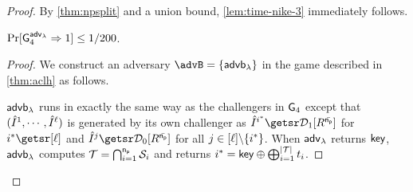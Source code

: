 \begin{proof}
By \cref{thm:npsplit} and a union bound, \cref{lem:time-nike-3} immediately follows. 
%
%
\begin{lemma}
$\Pr[\mathsf{G}_4^{{\mathsf{adv}}_\lambda}\Rightarrow 1]\leq 1/200$.
\end{lemma}
\begin{proof}
	We construct an adversary $\advB = \{\advb\}$ in the game described in \cref{thm:aclh} as follows.
	
	$\mathsf{advb}_{\lambda}$ runs in exactly the same way as the challengers in $\mathsf{G}_4$ except that $(\hat{I}^1, \cdots, \hat{I}^\ell)$ is generated by its own challenger as $\hat{\instance}^{i^*} \getsr \zkcdistone{R^{\bar{\pnum}}}$ for $i^* \getsr [\listlength]$ and $\hat{\instance}^{j} \getsr \zkcdistzero{R^{\bar{\pnum}}}$ for all $j \in [\ell]\backslash\{i^*\}$. When ${\mathsf{adv}}_\lambda$ returns $\mathsf{key}$, $\mathsf{advb}_{\lambda}$ computes $\mathcal{T} = \bigcap_{i=1}^{\mathsf{n_p}}\mathcal{S}_i$ and returns $i^* = \mathsf{key} \oplus \bigoplus_{i=1}^{|\mathcal{T}|}t_i$.
	

\end{proof}
\end{proof}
